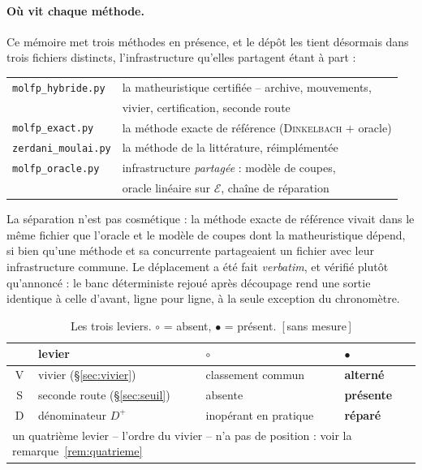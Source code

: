 \documentclass[11pt,a4paper]{article}
\theoremstyle{plain}
\theoremstyle{remark}
\newcommand{\Ecal}{\mathcal{E}}
\newcommand{\confna}{\textsf{\footnotesize[\,sans mesure\,]}}
\begin{document}
\paragraph{Où vit chaque méthode.} Ce mémoire met trois méthodes en
présence, et le dépôt les tient désormais dans trois fichiers distincts,
l'infrastructure qu'elles partagent étant à part :
%
\begin{center}
\setlength{\tabcolsep}{5pt}\small
\begin{tabular}{ll}
\toprule
\texttt{molfp\_hybride.py} & la matheuristique certifiée -- archive,
  mouvements,\\
 & vivier, certification, seconde route\\
\texttt{molfp\_exact.py} & la méthode exacte de référence
  (\textsc{Dinkelbach} $+$ oracle)\\
\texttt{zerdani\_moulai.py} & la méthode de la littérature, réimplémentée\\
\midrule
\texttt{molfp\_oracle.py} & infrastructure \emph{partagée} : modèle de
  coupes,\\
 & oracle linéaire sur $\Ecal$, chaîne de réparation\\
\bottomrule
\end{tabular}
\end{center}
%
\noindent
La séparation n'est pas cosmétique : la méthode exacte de référence vivait
dans le même fichier que l'oracle et le modèle de coupes dont la
matheuristique dépend, si bien qu'une méthode et sa concurrente partageaient
un fichier avec leur infrastructure commune. Le déplacement a été fait
\emph{verbatim}, et vérifié plutôt qu'annoncé : le banc déterministe rejoué
après découpage rend une sortie identique à celle d'avant, ligne pour ligne,
à la seule exception du chronomètre.

\begin{table}[H]
\centering
\caption{Les trois leviers. $\circ$ = absent, $\bullet$ = présent.\ \confna}
\label{tab:config}
\begin{tabular}{clll}
\toprule
& levier & $\circ$ & $\bullet$\\
\midrule
\textsf{V} & vivier (§\ref{sec:vivier})
 & classement commun & \textbf{alterné}\\
\textsf{S} & seconde route (§\ref{sec:seuil})
 & absente & \textbf{présente}\\
\textsf{D} & dénominateur $D^{+}$
 & inopérant en pratique & \textbf{réparé}\\
\midrule
\multicolumn{4}{l}{un quatrième levier -- l'ordre du vivier -- n'a pas de
 position : voir la remarque~\ref{rem:quatrieme}}\\
\bottomrule
\end{tabular}
\end{table}
\end{document}
